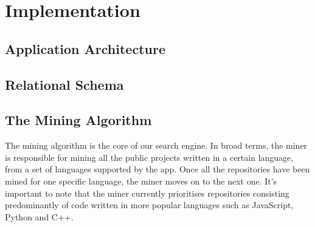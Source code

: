 \chapter{Implementation}

\section{Application Architecture}

\section{Relational Schema}

\section{The Mining Algorithm}

The mining algorithm is the core of our search engine.
In broad terms, the miner is responsible for mining all the public projects written in a certain language, from a set of languages supported by the app.
Once all the repositories have been mined for one specific language, the miner moves on to the next one.
It's important to note that the miner currently prioritises repositories consisting predominantly of code written in more popular languages such as JavaScript, Python and C++.

